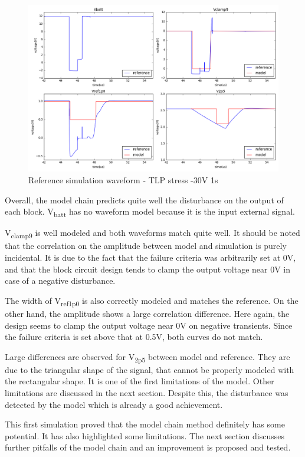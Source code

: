 \begin{figure}[!h]
  \centering
  \includegraphics[width=\textwidth]{src/4/figures/total_simulation_30V_1u.png}
  \caption{Reference simulation waveform - TLP stress -30V 1\textmugreek{}s }
  \label{fig:reference_simu}
\end{figure}

Overall, the model chain predicts quite well the disturbance on the output of each block.
V\textsubscript{batt} has no waveform model because it is the input external signal.

V\textsubscript{clamp9} is well modeled and both waveforms match quite well.
It should be noted that the correlation on the amplitude between model and simulation is purely incidental.
It is due to the fact that the failure criteria was arbitrarily set at 0V, and that the block circuit design tends to clamp the output voltage near 0V in case of a negative disturbance.

The width of V\textsubscript{ref1p0} is also correctly modeled and matches the reference.
On the other hand, the amplitude shows a large correlation difference.
Here again, the design seems to clamp the output voltage near 0V on negative transients.
Since the failure criteria is set above that at 0.5V, both curves do not match.

Large differences are observed for V\textsubscript{2p5} between model and reference.
They are due to the triangular shape of the signal, that cannot be properly modeled with the rectangular shape.
It is one of the first limitations of the model.
Other limitations are discussed in the next section.
Despite this, the disturbance was detected by the model which is already a good achievement.

This first simulation proved that the model chain method definitely has some potential.
It has also highlighted some limitations.
The next section discusses further pitfalls of the model chain and an improvement is proposed and tested.
